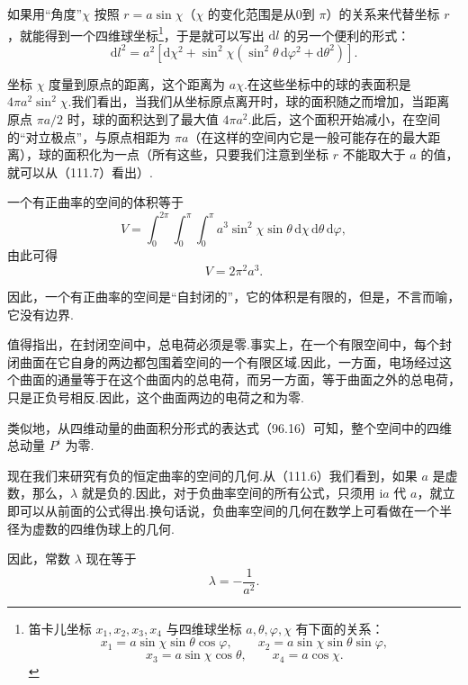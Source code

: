 如果用“角度”$\chi$ 按照 $r=a\sin\chi$（$\chi$ 的变化范围是从0到 $\pi$）的关系来代替坐标 $r$，就能得到一个四维球坐标\footnote{笛卡儿坐标 $x_{1},x_{2},x_{3},x_{4}$ 与四维球坐标 $a,\theta,\varphi,\chi$ 有下面的关系：
\[
x_{1}=a\sin\chi\sin\theta\cos\varphi,\qquad
x_{2}=a\sin\chi\sin\theta\sin\varphi,
\]
\[
x_{3}=a\sin\chi\cos\theta,\qquad
x_{4}=a\cos\chi.
\]}，于是就可以写出 $\mathrm{d}l$ 的另一个便利的形式：
\begin{equation}
  \mathrm{d}l^{2}=a^{2}[\mathrm{d}\chi^{2}
  +\sin^{2}\chi(\sin^{2}\theta\,\mathrm{d}\varphi^{2}+\mathrm{d}\theta^{2})].
\end{equation}

坐标 $\chi$ 度量到原点的距离，这个距离为 $a\chi$.在这些坐标中的球的表面积是 $4\pi a^{2}\sin^{2}\chi$.我们看出，当我们从坐标原点离开时，球的面积随之而增加，当距离原点 $\pi a/2$ 时，球的面积达到了最大值 $4\pi a^{2}$.此后，这个面积开始减小，在空间的“对立极点”，与原点相距为 $\pi a$（在这样的空间内它是一般可能存在的最大距离），球的面积化为一点（所有这些，只要我们注意到坐标 $r$ 不能取大于 $a$ 的值，就可以从（111.7）看出）.

一个有正曲率的空间的体积等于
\begin{equation*}
  V=\int_{0}^{2\pi}\int_{0}^{\pi}\int_{0}^{\pi}
  a^{3}\sin^{2}\chi\sin\theta\,\mathrm{d}\chi\,\mathrm{d}\theta\,\mathrm{d}\varphi,
\end{equation*}
由此可得
\begin{equation}
  V=2\pi^{2}a^{3}.
\end{equation}

因此，一个有正曲率的空间是“自封闭的”，它的体积是有限的，但是，不言而喻，它没有边界.

值得指出，在封闭空间中，总电荷必须是零.事实上，在一个有限空间中，每个封闭曲面在它自身的两边都包围着空间的一个有限区域.因此，一方面，电场经过这个曲面的通量等于在这个曲面内的总电荷，而另一方面，等于曲面之外的总电荷，只是正负号相反.因此，这个曲面两边的电荷之和为零.

类似地，从四维动量的曲面积分形式的表达式（96.16）可知，整个空间中的四维总动量 $P^{i}$ 为零.

现在我们来研究有负的恒定曲率的空间的几何.从（111.6）我们看到，如果 $a$ 是虚数，那么，$\lambda$ 就是负的.因此，对于负曲率空间的所有公式，只须用 $\mathrm{i}a$ 代 $a$，就立即可以从前面的公式得出.换句话说，负曲率空间的几何在数学上可看做在一个半径为虚数的四维伪球上的几何.

因此，常数 $\lambda$ 现在等于
\begin{equation}
  \lambda=-\frac{1}{a^{2}}.
\end{equation}

